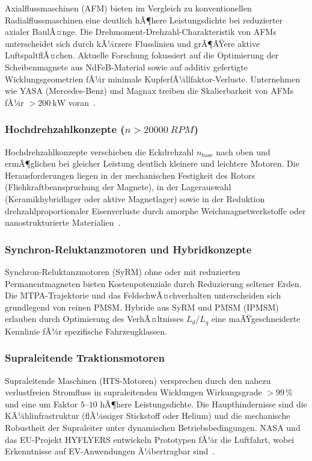 ﻿\documentclass[a4paper,12pt]{article}
\theoremstyle{definition}
\begin{document}
Axialflussmaschinen (AFM) bieten im Vergleich zu konventionellen Radialflussmaschinen
eine deutlich hÃ¶here Leistungsdichte bei reduzierter axialer BaulÃ¤nge. Die
Drehmoment-Drehzahl-Charakteristik von AFMs unterscheidet sich durch kÃ¼rzere
Flusslinien und grÃ¶ÃŸere aktive LuftspaltflÃ¤chen. Aktuelle Forschung fokussiert
auf die Optimierung der Scheibenmagnete aus NdFeB-Material sowie auf
additiv gefertigte Wicklungsgeometrien fÃ¼r minimale KupferfÃ¼llfaktor-Verluste.
Unternehmen wie YASA (Mercedes-Benz) und Magnax treiben die Skalierbarkeit von
AFMs fÃ¼r $>\SI{200}{\kilo\watt}$ voran~\cite{chalmers2011axial}.

\subsubsection{Hochdrehzahlkonzepte ($n > \SI{20000}{RPM}$)}

Hochdrehzahlkonzepte verschieben die Eckdrehzahl $n_{\mathrm{base}}$ nach oben
und ermÃ¶glichen bei gleicher Leistung deutlich kleinere und leichtere Motoren.
Die Herausforderungen liegen in der mechanischen Festigkeit des Rotors
(Fliehkraftbeanspruchung der Magnete), in der Lagerauswahl (Keramikhybridlager
oder aktive Magnetlager) sowie in der Reduktion drehzahlproportionaler
Eisenverluste durch amorphe Weichmagnetwerkstoffe oder nanostrukturierte
Materialien~\cite{gerada2014high}.

\subsubsection{Synchron-Reluktanzmotoren und Hybridkonzepte}

Synchron-Reluktanzmotoren (SyRM) ohne oder mit reduzierten Permanentmagneten
bieten Kostenpotenziale durch Reduzierung seltener Erden. Die MTPA-Trajektorie
und das FeldschwÃ¤chverhalten unterscheiden sich grundlegend von reinen PMSM.
Hybride aus SyRM und PMSM (IPMSM) erlauben durch Optimierung des VerhÃ¤ltnisses
$L_d/L_q$ eine maÃŸgeschneiderte Kennlinie fÃ¼r spezifische Fahrzeugklassen.

\subsubsection{Supraleitende Traktionsmotoren}

Supraleitende Maschinen (HTS-Motoren) versprechen durch den nahezu verlustfreien
Stromfluss in supraleitenden Wicklungen Wirkungsgrade $> 99\,\%$ und eine um
Faktor $5$--$10$ hÃ¶here Leistungsdichte. Die Haupthindernisse sind die
KÃ¼hlinfrastruktur (flÃ¼ssiger Stickstoff oder Helium) und die mechanische
Robustheit der Supraleiter unter dynamischen Betriebsbedingungen. NASA und
das EU-Projekt HYFLYERS entwickeln Prototypen fÃ¼r die Luftfahrt, wobei
Erkenntnisse auf EV-Anwendungen Ã¼bertragbar sind~\cite{filippenko2017superconducting}.
\end{document}
